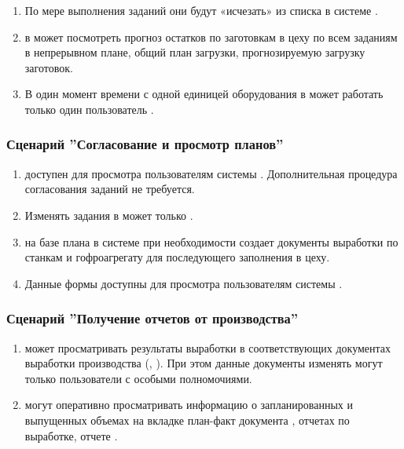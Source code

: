 \begin{enumerate}
\item	По мере выполнения заданий они будут «исчезать» из списка    в системе \gofro.
\item	\planner в  может посмотреть прогноз  остатков по заготовкам в цеху по всем заданиям в непрерывном плане, общий план загрузки, прогнозируемую загрузку заготовок.
\item	В один момент времени с одной единицей оборудования в  может работать только один пользователь \planner.



\end{enumerate}





\subsubsection{Сценарий ''Согласование и просмотр планов''}
\label{bp:plan_5}
\begin{enumerate}

\item	{} доступен для просмотра пользователям системы \gofro. Дополнительная процедура согласования заданий не требуется.
\item	Изменять задания в  может только \planner.


\item	\planner на базе плана в системе \gofro при необходимости создает документы выработки по станкам и гофроагрегату для последующего заполнения в цеху.
\item Данные формы	 доступны для просмотра пользователям системы \gofro.


\end{enumerate}


\subsubsection{Сценарий ''Получение отчетов от производства''}
\label{bp:plan_6}


\begin{enumerate}


\item \planner может просматривать результаты выработки в соответствующих документах выработки производства (, ). При этом данные документы изменять могут только пользователи с особыми полномочиями.
\item \manager могут оперативно просматривать информацию о запланированных и выпущенных объемах на вкладке план-факт документа , отчетах по выработке, отчете .
\end{enumerate}



